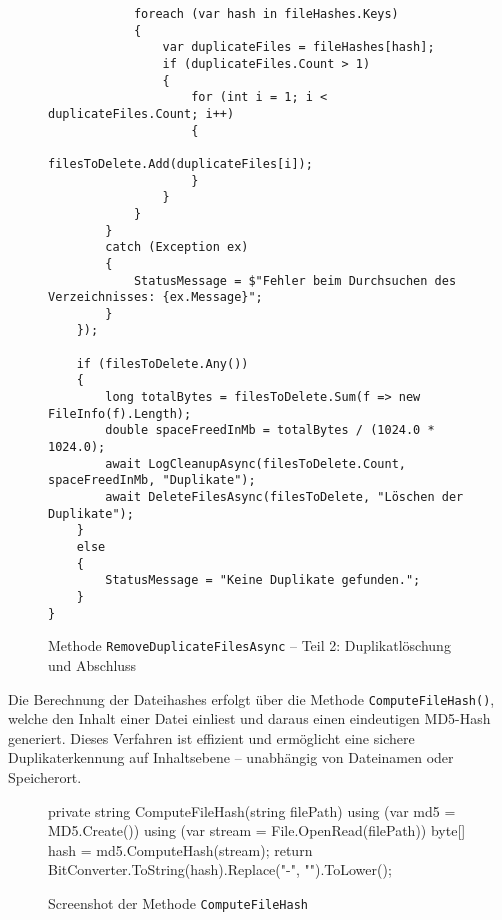 \begin{figure}[H]
\centering
\begin{verbatim}
            foreach (var hash in fileHashes.Keys)
            {
                var duplicateFiles = fileHashes[hash];
                if (duplicateFiles.Count > 1)
                {
                    for (int i = 1; i < duplicateFiles.Count; i++)
                    {
                        filesToDelete.Add(duplicateFiles[i]);
                    }
                }
            }
        }
        catch (Exception ex)
        {
            StatusMessage = $"Fehler beim Durchsuchen des Verzeichnisses: {ex.Message}";
        }
    });

    if (filesToDelete.Any())
    {
        long totalBytes = filesToDelete.Sum(f => new FileInfo(f).Length);
        double spaceFreedInMb = totalBytes / (1024.0 * 1024.0);
        await LogCleanupAsync(filesToDelete.Count, spaceFreedInMb, "Duplikate");
        await DeleteFilesAsync(filesToDelete, "Löschen der Duplikate");
    }
    else
    {
        StatusMessage = "Keine Duplikate gefunden.";
    }
}
\end{verbatim}
\caption{Methode \texttt{RemoveDuplicateFilesAsync} – Teil 2: Duplikatlöschung und Abschluss}
\label{lst:removedupes2}
\end{figure}


Die Berechnung der Dateihashes erfolgt über die Methode \texttt{ComputeFileHash()}, welche den Inhalt einer Datei einliest und daraus einen eindeutigen MD5-Hash generiert. Dieses Verfahren ist effizient und ermöglicht eine sichere Duplikaterkennung auf Inhaltsebene – unabhängig von Dateinamen oder Speicherort.

\begin{figure}[H]
    \centering
    \begin{cs}
private string ComputeFileHash(string filePath)
{
    using (var md5 = MD5.Create())
    {
        using (var stream = File.OpenRead(filePath))
        {
            byte[] hash = md5.ComputeHash(stream);
            return BitConverter.ToString(hash).Replace("-", "").ToLower();
        }
    }
}
\end{cs}
    \caption{Screenshot der Methode \texttt{ComputeFileHash}}
\end{figure}

